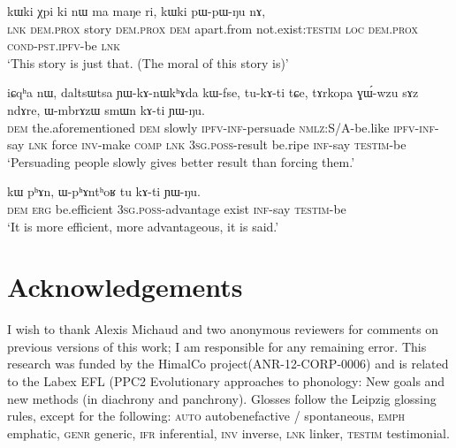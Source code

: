 \documentclass[12pt]{article}
\newcommand{\ipab}[1]{{\phon#1}}
\newcommand{\gltt}{ \vspace{-1em}  \glt}
\begin{document}
\begin{myexe} 
\gll   \ipab{tɕendɤre} \ipab{kɯki} \ipab{χpi} \ipab{ki} \ipab{nɯ} \ipab{ma} \ipab{maŋe} \ipab{ri,} \ipab{kɯki} \ipab{pɯ-pɯ-ŋu} \ipab{nɤ,} \\ 
  \textsc{lnk}  \textsc{dem}.\textsc{prox} story \textsc{dem}.\textsc{prox} \textsc{dem} apart.from not.exist:\textsc{testim} \textsc{loc} \textsc{dem}.\textsc{prox} \textsc{cond}-\textsc{pst}.\textsc{ipfv}-be  \textsc{lnk} \\ 
 \gltt  `This story is just that. (The moral of this story is)'
\end{myexe} 

\begin{myexe} 
\gll   \ipab{nɤkinɯ,} \ipab{iɕqʰa} \ipab{nɯ,} \ipab{daltsɯtsa} \ipab{ɲɯ-kɤ-nɯkʰɤda} \ipab{kɯ-fse,} \ipab{tu-kɤ-ti}  \ipab{tɕe,} \ipab{tɤrkopa} \ipab{ɣɯ́-wzu} \ipab{sɤz} \ipab{ndɤre,} \ipab{ɯ-mbrɤzɯ} \ipab{smɯn} \ipab{kɤ-ti} \ipab{ɲɯ-ŋu.}\\ 
 \textsc{dem} the.aforementioned \textsc{dem} slowly     \textsc{ipfv}-\textsc{inf}-persuade   \textsc{nmlz}:S/A-be.like \textsc{ipfv}-\textsc{inf}-say \textsc{lnk}  force    \textsc{inv}-make \textsc{comp} \textsc{lnk}    3\textsc{sg}.\textsc{poss}-result   be.ripe \textsc{inf}-say \textsc{testim}-be\\ 
 \glt `Persuading people slowly gives better result than forcing them.' 
\end{myexe} 
 
\begin{myexe} 
\gll   \ipab{nɯ} \ipab{kɯ} \ipab{pʰɤn,} \ipab{ɯ-pʰɤntʰoʁ} \ipab{tu} \ipab{kɤ-ti} \ipab{ɲɯ-ŋu.} \\ 
 \textsc{dem} \textsc{erg} be.efficient 3\textsc{sg}.\textsc{poss}-advantage    exist \textsc{inf}-say \textsc{testim}-be\\  
 \gltt  `It is more efficient, more advantageous, it is said.'
\end{myexe} 

\section*{Acknowledgements}

I wish to thank Alexis Michaud and two anonymous reviewers for comments on previous versions of this work; I am responsible for any remaining error. This research was funded by the HimalCo project(ANR-12-CORP-0006) and is related to the Labex EFL (PPC2 Evolutionary approaches to phonology: New goals and new methods (in diachrony and panchrony). Glosses follow the Leipzig glossing rules, except for the following: \textsc{auto} autobenefactive / spontaneous, \textsc{emph} emphatic, \textsc{genr} generic, \textsc{ifr} inferential, \textsc{inv} inverse, \textsc{lnk} linker, \textsc{testim} testimonial.
\end{document}
